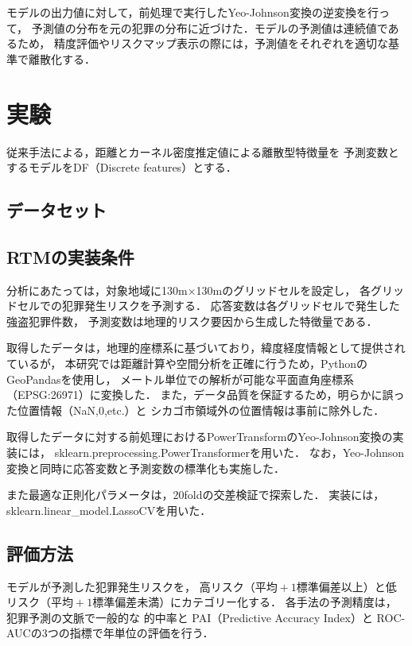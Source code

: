 モデルの出力値に対して，前処理で実行したYeo-Johnson変換の逆変換を行って，
予測値の分布を元の犯罪の分布に近づけた．モデルの予測値は連続値であるため，
精度評価やリスクマップ表示の際には，予測値をそれぞれを適切な基準で離散化する．
\section{実験}
従来手法\cite{caplan2015risk}による，距離とカーネル密度推定値\cite{bishop2007}による離散型特徴量を
予測変数とするモデルをDF（Discrete features）とする．
\subsection{データセット}


\subsection{RTMの実装条件}
分析にあたっては，対象地域に130m×130mのグリッドセルを設定し，
各グリッドセルでの犯罪発生リスクを予測する．
応答変数は各グリッドセルで発生した強盗犯罪件数，
予測変数は地理的リスク要因から生成した特徴量である．

取得したデータは，地理的座標系に基づいており，緯度経度情報として提供されているが，
本研究では距離計算や空間分析を正確に行うため，PythonのGeoPandas\cite{geopandas}を使用し，
メートル単位での解析が可能な平面直角座標系（EPSG:26971）に変換した．
また，データ品質を保証するため，明らかに誤った位置情報（NaN,0,etc.）と
シカゴ市領域外の位置情報は事前に除外した．

取得したデータに対する前処理におけるPowerTransformのYeo-Johnson変換の実装には，
sklearn.preprocessing.PowerTransformer\cite{scikit-learn}を用いた．
なお，Yeo-Johnson変換と同時に応答変数と予測変数の標準化も実施した．

また最適な正則化パラメータは，20foldの交差検証\cite{islp}で探索した．
実装には，sklearn.linear\_model.LassoCV\cite{scikit-learn}を用いた．
\subsection{評価方法}
モデルが予測した犯罪発生リスクを，
高リスク（$平均+1標準偏差以上$）と低リスク（$平均+1標準偏差未満$）にカテゴリー化する．
各手法の予測精度は，犯罪予測の文脈で一般的な
的中率\cite{joshi2020considerationsdevelopingpredictivemodels}と
PAI（Predictive Accuracy Index）\cite{chainey2008utility}と
ROC-AUC\cite{islp}の3つの指標で年単位の評価を行う．

